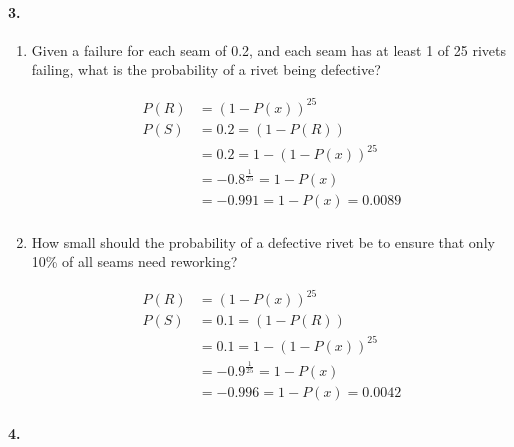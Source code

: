     \pagebreak

    \paragraph*{3.}

    \begin{enumerate}[label=(\alph*)]
        \item Given a failure for each seam of 0.2, and each seam has at least 1 of 25 rivets failing, what is the probability of a rivet being defective?

        \begin{mdframed}
            \begin{align*}
                P(R) & = (1 - P(x))^{25}    \\
                P(S) & = 0.2 = (1 - P(R))   \\
                     & = 0.2 = 1 - (1 - P(x))^{25}\\
                     & = -0.8^{\frac{1}{25}} = 1-P(x)    \\
                     & = -0.991 = 1-P(x) = \boxed{0.0089} \\
            \end{align*}
        \end{mdframed}

        \item How small should the probability of a defective rivet be to ensure that only 10\% of all seams need reworking?
        
        \begin{mdframed}
            \begin{align*}
                P(R) & = (1 - P(x))^{25}    \\
                P(S) & = 0.1 = (1 - P(R))   \\
                     & = 0.1 = 1 - (1 - P(x))^{25}\\
                     & = -0.9^{\frac{1}{25}} = 1-P(x)    \\
                     & = -0.996 = 1-P(x) = \boxed{0.0042} 
            \end{align*}
        \end{mdframed}
    \end{enumerate}

    \paragraph*{4.}

